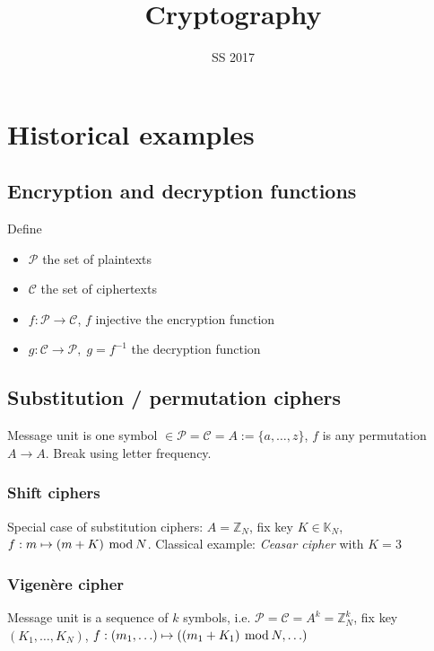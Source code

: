 \documentclass[a4paper]{scrartcl}
\title{Cryptography}
\subtitle{SS 2017}
\newcommand\Z{\mathbb Z}
\newcommand\cP{\mathcal P}
\newcommand\cC{\mathcal C}
\renewcommand\mod{\hspace*{0.4em}\mathrm{mod}\hspace*{0.2em}}
\begin{document}
\maketitle
\thispagestyle{empty}
\newpage

\setcounter{tocdepth}{2}
\tableofcontents
\newpage


\section{Historical examples}

\subsection{Encryption and decryption functions}

Define\begin{itemize}
    \item $\cP$ the set of plaintexts
    \item $\cC$ the set of ciphertexts
    \item $f: \cP \rightarrow \cC$, $f$ injective the encryption function
    \item $g: \cC \rightarrow \cP,\;g=f^{-1}$ the decryption function
\end{itemize}

\subsection{Substitution / permutation ciphers}

Message unit is one symbol $\in \cP = \cC = A := \{a,\hdots,z\}$,
$f$ is any permutation $A \rightarrow A$. Break using letter frequency.

\subsubsection{Shift ciphers}

Special case of substitution ciphers: $A = \Z_N$, fix key $K\in\mathbb K_N$,
$f: m\mapsto (m + K)\mod N$. Classical example: \textit{Ceasar cipher} with $K=3$

\subsubsection{Vigen\`ere cipher}

Message unit is a sequence of $k$ symbols, i.e. $\cP = \cC = A^k = \Z_N^k$,
fix key $(K_1,\hdots,K_N)$, $f: (m_1,\hdots)\mapsto((m_1+K_1)\mod N, \hdots)$
\end{document}
